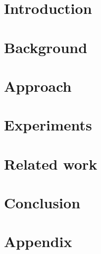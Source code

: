 \documentclass[headsepline,footsepline,oneside,fontsize=11pt,paper=a4,listof=totoc,bibliography=totoc,BCOR=12mm,DIV=13]{scrbook} %
\begin{document}

\mainmatter{}

\chapter{Introduction}


\chapter{Background}
\label{ch:background}



\chapter{Approach}
\label{ch:approach}



\chapter{Experiments}
\label{ch:experiments}


\chapter{Related work}



\chapter{Conclusion}


\newpage
\appendix
\chapter{Appendix}

\end{document}
